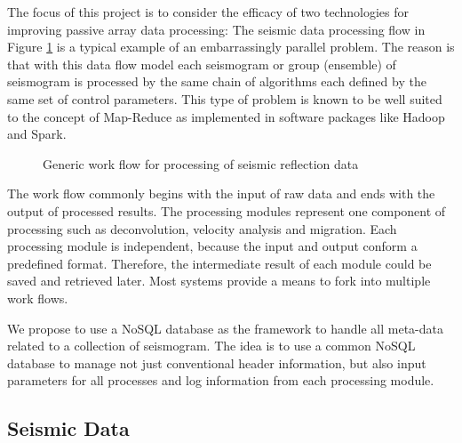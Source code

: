 \documentclass[9pt,twocolumn,twoside]{../../styles/osajnl}
\begin{document}
The focus of this project is to consider the efficacy of two technologies for improving passive array data processing:
The seismic data processing flow in Figure \ref{fig:Seismic-workflow} is a typical example of an embarrassingly parallel problem.  The reason is that with this data flow model each seismogram or group (ensemble) of seismogram is processed by the same chain of algorithms each defined by the same set of control parameters.  This type of problem is known to be well suited to the concept of Map-Reduce as implemented in software packages like Hadoop and Spark.

\begin{figure}[htbp]
\centering
{}
\caption{Generic work flow for processing of seismic reflection data}
\label{fig:Seismic-workflow}
\end{figure}

The work flow commonly begins with the input of raw data and ends with the output of processed results. The processing modules represent one component of processing such as deconvolution, velocity analysis and migration.  Each processing module is independent, because the input and output conform a predefined format. Therefore, the intermediate result of each module could be saved and retrieved later.  Most systems provide a means to fork into multiple work flows.

We propose to use a NoSQL database as the framework to handle all meta-data related to a collection of seismogram.  The idea is to use a common NoSQL database to manage not just conventional header information, but also input parameters for all processes and log information from each processing module.

\subsection{Seismic Data}
\end{document}
